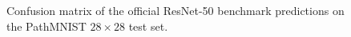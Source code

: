 \begin{figure}[htbp]
    \centering
    
    \caption{Confusion matrix of the official ResNet-50 benchmark predictions on
    the PathMNIST $28 \times 28$ test set.}
    \label{fig:resnet50-28-confusion-matrix}
\end{figure}
